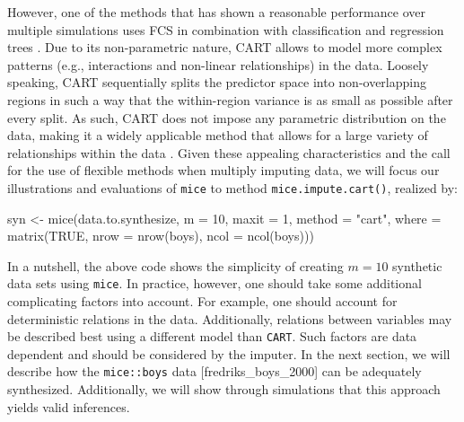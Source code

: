 \documentclass[psych,article,submit,moreauthors,pdftex]{mdpi}
\newenvironment{Shaded}{\begin{snugshade}}{\end{snugshade}}
\newcommand{\AttributeTok}[1]{\textcolor[rgb]{0.77,0.63,0.00}{#1}}
\newcommand{\ConstantTok}[1]{\textcolor[rgb]{0.00,0.00,0.00}{#1}}
\newcommand{\DecValTok}[1]{\textcolor[rgb]{0.00,0.00,0.81}{#1}}
\newcommand{\FunctionTok}[1]{\textcolor[rgb]{0.00,0.00,0.00}{#1}}
\newcommand{\NormalTok}[1]{#1}
\newcommand{\OtherTok}[1]{\textcolor[rgb]{0.56,0.35,0.01}{#1}}
\newcommand{\StringTok}[1]{\textcolor[rgb]{0.31,0.60,0.02}{#1}}
\begin{document}
However, one of the methods that has shown a reasonable performance over
multiple simulations uses FCS in combination with classification and
regression trees
\citep[CART;][]{breiman_cart_1984, reiter_cart_2005, burgette_reiter_cart_2010, doove_buuren_recursive_2014, raab_practical_2016}.
Due to its non-parametric nature, CART allows to model more complex
patterns (e.g., interactions and non-linear relationships) in the data.
Loosely speaking, CART sequentially splits the predictor space into
non-overlapping regions in such a way that the within-region variance is
as small as possible after every split. As such, CART does not impose
any parametric distribution on the data, making it a widely applicable
method that allows for a large variety of relationships within the data
\citep{islr_2013}. Given these appealing characteristics and the call
for the use of flexible methods when multiply imputing data, we will
focus our illustrations and evaluations of \texttt{mice} to method
\texttt{mice.impute.cart()}, realized by:

\begin{Shaded}
\begin{Highlighting}[]
\NormalTok{syn }\OtherTok{\textless{}{-}} \FunctionTok{mice}\NormalTok{(data.to.synthesize, }
            \AttributeTok{m =} \DecValTok{10}\NormalTok{,}
            \AttributeTok{maxit =} \DecValTok{1}\NormalTok{, }
            \AttributeTok{method =} \StringTok{"cart"}\NormalTok{,}
            \AttributeTok{where =} \FunctionTok{matrix}\NormalTok{(}\ConstantTok{TRUE}\NormalTok{, }
                           \AttributeTok{nrow =} \FunctionTok{nrow}\NormalTok{(boys),}
                           \AttributeTok{ncol =} \FunctionTok{ncol}\NormalTok{(boys)))}
\end{Highlighting}
\end{Shaded}

In a nutshell, the above code shows the simplicity of creating
\(m = 10\) synthetic data sets using \texttt{mice}. In practice,
however, one should take some additional complicating factors into
account. For example, one should account for deterministic relations in
the data. Additionally, relations between variables may be described
best using a different model than \texttt{CART}. Such factors are data
dependent and should be considered by the imputer. In the next section,
we will describe how the \texttt{mice::boys} data
{[}fredriks\_boys\_2000{]} can be adequately synthesized. Additionally,
we will show through simulations that this approach yields valid
inferences.
\end{document}
